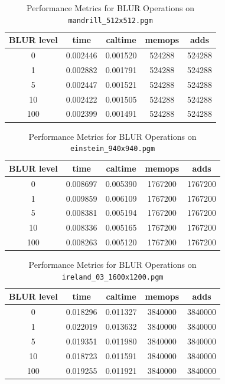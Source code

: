 \documentclass{report}
\begin{document}
\begin{table}[h]
    \centering
    \begin{tabular}{ccccc}
        \toprule
        \textbf{BLUR level} & \textbf{time} & \textbf{caltime} & \textbf{memops} & \textbf{adds} \\
        \midrule
        0 & 0.002446 & 0.001520 & 524288 & 524288 \\
        1 & 0.002882 & 0.001791 & 524288 & 524288 \\
        5 & 0.002447 & 0.001521 & 524288 & 524288 \\
        10 & 0.002422 & 0.001505 & 524288 & 524288 \\
        100 & 0.002399 & 0.001491 & 524288 & 524288 \\
        \bottomrule
    \end{tabular}
    \caption*{Performance Metrics for BLUR Operations on \texttt{mandrill\_512x512.pgm}}
\end{table}


\begin{table}[h]
    \centering
    \begin{tabular}{ccccc}
        \toprule
        \textbf{BLUR level} & \textbf{time} & \textbf{caltime} & \textbf{memops} & \textbf{adds} \\
        \midrule
        0 & 0.008697 & 0.005390 & 1767200 & 1767200 \\
        1 & 0.009859 & 0.006109 & 1767200 & 1767200 \\
        5 & 0.008381 & 0.005194 & 1767200 & 1767200 \\
        10 & 0.008336 & 0.005165 & 1767200 & 1767200 \\
        100 & 0.008263 & 0.005120 & 1767200 & 1767200 \\
        \bottomrule
    \end{tabular}
    \caption*{Performance Metrics for BLUR Operations on \texttt{einstein\_940x940.pgm}}
\end{table}

\begin{table}[h]
    \centering
    \begin{tabular}{ccccc}
        \toprule
        \textbf{BLUR level} & \textbf{time} & \textbf{caltime} & \textbf{memops} & \textbf{adds} \\
        \midrule
        0 & 0.018296 & 0.011327 & 3840000 & 3840000 \\
        1 & 0.022019 & 0.013632 & 3840000 & 3840000 \\
        5 & 0.019351 & 0.011980 & 3840000 & 3840000 \\
        10 & 0.018723 & 0.011591 & 3840000 & 3840000 \\
        100 & 0.019255 & 0.011921 & 3840000 & 3840000 \\
        \bottomrule
    \end{tabular}
    \caption*{Performance Metrics for BLUR Operations on \texttt{ireland\_03\_1600x1200.pgm}}
\end{table}
\end{document}
